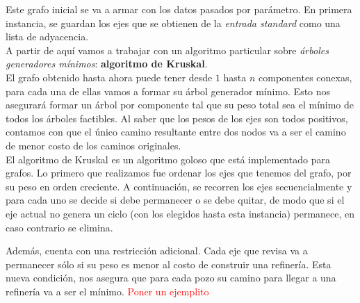 Este grafo inicial se va a armar con los datos pasados por par\'ametro. En primera instancia, se guardan los ejes que se obtienen de la \emph{entrada standard} como una lista de adyacencia.\\

A partir de aqu\'i vamos a trabajar con un algoritmo particular sobre \emph{\'arboles generadores m\'inimos}: \textbf{algoritmo de Kruskal}.\\

El grafo obtenido hasta ahora puede tener desde $1$ hasta $n$ componentes conexas, para cada una de ellas vamos a formar su \'arbol generador m\'inimo. Esto nos asegurar\'a formar un \'arbol por componente tal que su peso total sea el m\'inimo de todos los \'arboles factibles. Al saber que los pesos de los ejes son todos positivos, contamos con que el \'unico camino resultante entre dos nodos va a ser el camino de menor costo de los caminos originales.\\


El algoritmo de Kruskal es un algoritmo goloso que est\'a implementado para grafos. Lo primero que realizamos fue ordenar los ejes que tenemos del grafo, por su peso en orden creciente. A continuaci\'on, se recorren los ejes secuencialmente y para cada uno se decide si debe permanecer o se debe quitar, de modo que si el eje actual no genera un ciclo (con los elegidos hasta esta instancia) permanece, en caso contrario se elimina.

Adem\'as, cuenta con una restricci\'on adicional. Cada eje que revisa va a permanecer s\'olo si su peso es menor al costo de construir una refiner\'ia. Esta nueva condici\'on, nos asegura que para cada pozo su camino para llegar a una refiner\'ia va a ser el m\'inimo. \textcolor{red}{Poner un ejemplito}\\

